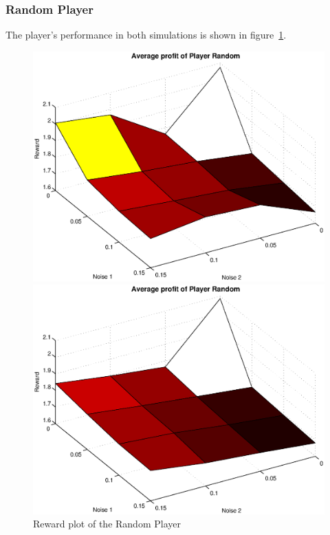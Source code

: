 \subsubsection{Random Player}
The player's performance in both simulations is shown in figure~\ref{pic player random}.\\
\begin{figure}[h]

\begin{minipage}[hbt]{0.65\textwidth}
	\centering
	\includegraphics[width=\textwidth]{pics/simulation1/Reward_vs_Noise_of_Player_Random}
\end{minipage}
\hfill
\begin{minipage}[hbt]{0.3\textwidth}
	\centering
	\includegraphics[width=\textwidth]{pics/simulation2/Reward_vs_Noise_of_Player_Random}
\end{minipage}
	\caption{Reward plot of the Random Player}
	\label{pic player random}
\end{figure}

